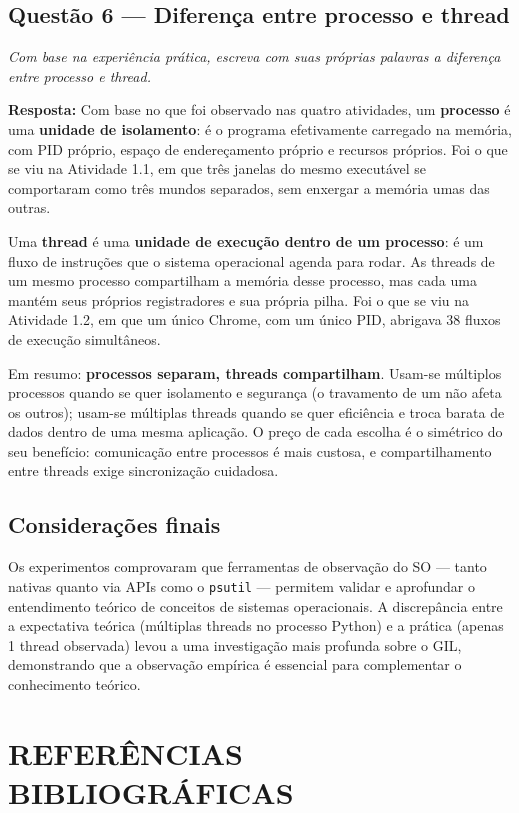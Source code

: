 \documentclass[12pt,a4paper]{article}
\begin{document}
\subsection{Questão 6 — Diferença entre processo e thread}

\textit{Com base na experiência prática, escreva com suas próprias palavras a diferença entre processo e thread.}

\textbf{Resposta:} Com base no que foi observado nas quatro atividades, um \textbf{processo} é uma \textbf{unidade de isolamento}: é o programa efetivamente carregado na memória, com PID próprio, espaço de endereçamento próprio e recursos próprios. Foi o que se viu na Atividade 1.1, em que três janelas do mesmo executável se comportaram como três mundos separados, sem enxergar a memória umas das outras.

Uma \textbf{thread} é uma \textbf{unidade de execução dentro de um processo}: é um fluxo de instruções que o sistema operacional agenda para rodar. As threads de um mesmo processo compartilham a memória desse processo, mas cada uma mantém seus próprios registradores e sua própria pilha. Foi o que se viu na Atividade 1.2, em que um único Chrome, com um único PID, abrigava 38 fluxos de execução simultâneos.

Em resumo: \textbf{processos separam, threads compartilham}. Usam-se múltiplos processos quando se quer isolamento e segurança (o travamento de um não afeta os outros); usam-se múltiplas threads quando se quer eficiência e troca barata de dados dentro de uma mesma aplicação. O preço de cada escolha é o simétrico do seu benefício: comunicação entre processos é mais custosa, e compartilhamento entre threads exige sincronização cuidadosa.

\subsection{Considerações finais}

Os experimentos comprovaram que ferramentas de observação do SO — tanto nativas quanto via APIs como o \texttt{psutil} — permitem validar e aprofundar o entendimento teórico de conceitos de sistemas operacionais. A discrepância entre a expectativa teórica (múltiplas threads no processo Python) e a prática (apenas 1 thread observada) levou a uma investigação mais profunda sobre o GIL, demonstrando que a observação empírica é essencial para complementar o conhecimento teórico.

\section{REFERÊNCIAS BIBLIOGRÁFICAS}
\end{document}
